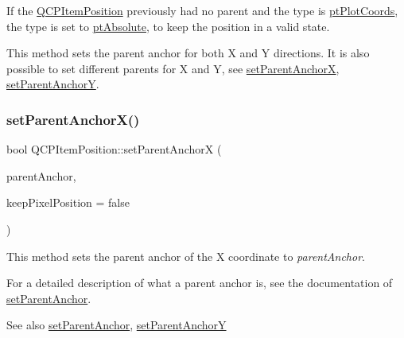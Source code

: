 If the \mbox{\hyperlink{class_q_c_p_item_position}{Q\+C\+P\+Item\+Position}} previously had no parent and the type is \mbox{\hyperlink{class_q_c_p_item_position_aad9936c22bf43e3d358552f6e86dbdc8ad5ffb8dc99ad73263f7010c77342294c}{pt\+Plot\+Coords}}, the type is set to \mbox{\hyperlink{class_q_c_p_item_position_aad9936c22bf43e3d358552f6e86dbdc8a564f5e53e550ead1ec5fc7fc7d0b73e0}{pt\+Absolute}}, to keep the position in a valid state.

This method sets the parent anchor for both X and Y directions. It is also possible to set different parents for X and Y, see \mbox{\hyperlink{class_q_c_p_item_position_add71461a973927c74e42179480916d9c}{set\+Parent\+AnchorX}}, \mbox{\hyperlink{class_q_c_p_item_position_add5ec1db9d19cec58a3b5c9e0a0c3f9d}{set\+Parent\+AnchorY}}. \mbox{\label{class_q_c_p_item_position_add71461a973927c74e42179480916d9c}} 
\subsubsection{\texorpdfstring{set\+Parent\+Anchor\+X()}{setParentAnchorX()}}
{\footnotesize\ttfamily bool Q\+C\+P\+Item\+Position\+::set\+Parent\+AnchorX (\begin{DoxyParamCaption}\item[{\mbox{\hyperlink{class_q_c_p_item_anchor}{Q\+C\+P\+Item\+Anchor}} $\ast$}]{parent\+Anchor,  }\item[{bool}]{keep\+Pixel\+Position = {\ttfamily false} }\end{DoxyParamCaption})}

This method sets the parent anchor of the X coordinate to {\itshape parent\+Anchor}.

For a detailed description of what a parent anchor is, see the documentation of \mbox{\hyperlink{class_q_c_p_item_position_ac094d67a95d2dceafa0d50b9db3a7e51}{set\+Parent\+Anchor}}.

\begin{DoxySeeAlso}{See also}
\mbox{\hyperlink{class_q_c_p_item_position_ac094d67a95d2dceafa0d50b9db3a7e51}{set\+Parent\+Anchor}}, \mbox{\hyperlink{class_q_c_p_item_position_add5ec1db9d19cec58a3b5c9e0a0c3f9d}{set\+Parent\+AnchorY}} 
\end{DoxySeeAlso}
\mbox{\label{class_q_c_p_item_position_add5ec1db9d19cec58a3b5c9e0a0c3f9d}} 
